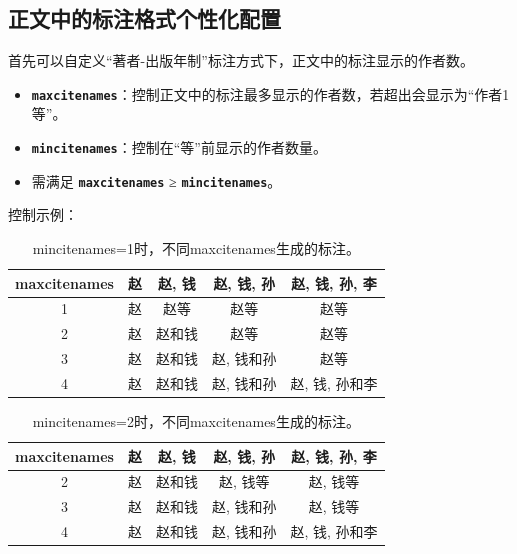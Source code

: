 \subsection{正文中的标注格式个性化配置}

首先可以自定义“著者-出版年制”标注方式下，正文中的标注显示的作者数。
\begin{itemize}
    \item \texttt{\bfseries maxcitenames}：控制正文中的标注最多显示的作者数，若超出会显示为“作者1等”。
    \item \texttt{\bfseries mincitenames}：控制在“等”前显示的作者数量。
    \item 需满足 \texttt{\bfseries maxcitenames} ≥ \texttt{\bfseries mincitenames}。
\end{itemize}

控制示例：
\begin{table}[htb]
    \centering
    \begin{tabular}{ccccc}
        \toprule[1.5pt]
        \textbf{maxcitenames} & \textbf{赵} & \textbf{赵, 钱} & \textbf{赵, 钱, 孙} & \textbf{赵, 钱, 孙, 李} \\
        \midrule
        1 & 赵 & 赵等 & 赵等 & 赵等 \\
        \midrule
        2 & 赵 & 赵和钱 & 赵等 & 赵等 \\
        \midrule
        3 & 赵 & 赵和钱 & 赵, 钱和孙 & 赵等 \\
        \midrule
        4 & 赵 & 赵和钱 & 赵, 钱和孙 & 赵, 钱, 孙和李 \\
        \bottomrule[1.5pt]
    \end{tabular}
    \caption{mincitenames=1时，不同maxcitenames生成的标注。}
    \label{tab:mincitenames1}
\end{table}
\begin{table}[htb]
    \centering
    \begin{tabular}{ccccc}
        \toprule[1.5pt]
        \textbf{maxcitenames} & \textbf{赵} & \textbf{赵, 钱} & \textbf{赵, 钱, 孙} & \textbf{赵, 钱, 孙, 李} \\
        \midrule
        2 & 赵 & 赵和钱 & 赵, 钱等 & 赵, 钱等 \\
        \midrule
        3 & 赵 & 赵和钱 & 赵, 钱和孙 & 赵, 钱等 \\
        \midrule
        4 & 赵 & 赵和钱 & 赵, 钱和孙 & 赵, 钱, 孙和李 \\
        \bottomrule[1.5pt]
    \end{tabular}
    \caption{mincitenames=2时，不同maxcitenames生成的标注。}
    \label{tab:mincitenames2}
\end{table}

